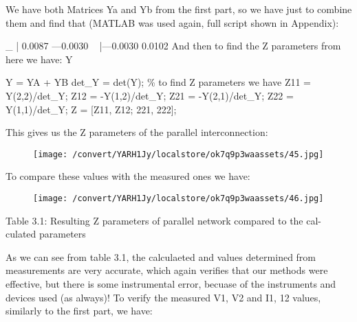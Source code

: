 \documentclass[12pt]{report}
\begin{document}
\vspace{10pt}

    We have both Matrices Ya and Yb from the first part, so we have just to  combine them and find that (MATLAB was used again, full script shown in  Appendix): 

\vspace{10pt}

    \_ | 0.0087 —0.0030  ~ |—0.0030 0.0102    And then to find the Z parameters from here we have:    Y 

\vspace{10pt}

    Y = YA + YB   det\_Y = det(Y);   \% to find Z parameters we have  Z11 = Y(2,2)/det\_Y;   Z12 = -Y(1,2)/det\_Y;   Z21 = -Y(2,1)/det\_Y;   Z22 = Y(1,1)/det\_Y;   Z = [Z11, Z12; 221, 222]; 

\vspace{10pt}

    This gives us the Z parameters of the parallel interconnection: 

\vspace{10pt}

\begin{figure}[h]

\texttt{[image: /convert/YARH1Jy/localstore/ok7q9p3waassets/45.jpg]}

\centering

\end{figure}

    To compare these values with the measured ones we have: 

\vspace{10pt}

\begin{figure}[h]

\texttt{[image: /convert/YARH1Jy/localstore/ok7q9p3waassets/46.jpg]}

\centering

\end{figure}

    Table 3.1: Resulting Z parameters of parallel network compared to the cal-  culated parameters 

\vspace{10pt}

    As we can see from table 3.1, the calculaeted and values determined from  measurements are very accurate, which again verifies that our methods were  effective, but there is some instrumental error, becuase of the instruments  and devices used (as always)!   To verify the measured V1, V2 and I1, 12 values, similarly to the first part,  we have: 
\end{document}
